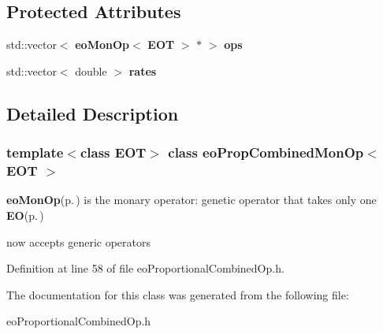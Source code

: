 \subsection*{Protected Attributes}
\begin{CompactItemize}
\item 
std::vector$<$ {\bf eo\-Mon\-Op}$<$ {\bf EOT} $>$ $\ast$ $>$ {\bf ops}\label{classeo_prop_combined_mon_op_p0}

\item 
std::vector$<$ double $>$ {\bf rates}\label{classeo_prop_combined_mon_op_p1}

\end{CompactItemize}


\subsection{Detailed Description}
\subsubsection*{template$<$class EOT$>$ class eo\-Prop\-Combined\-Mon\-Op$<$ EOT $>$}

{\bf eo\-Mon\-Op}{\rm (p.\,\pageref{classeo_mon_op})} is the monary operator: genetic operator that takes only one {\bf EO}{\rm (p.\,\pageref{class_e_o})} 

now accepts generic operators 



Definition at line 58 of file eo\-Proportional\-Combined\-Op.h.

The documentation for this class was generated from the following file:\begin{CompactItemize}
\item 
eo\-Proportional\-Combined\-Op.h\end{CompactItemize}
